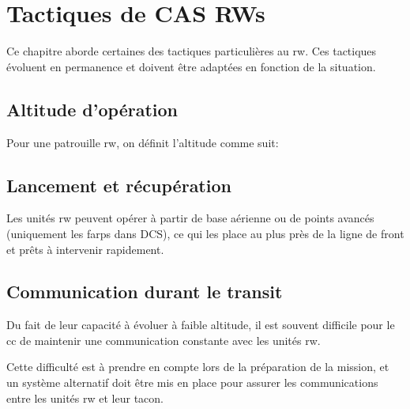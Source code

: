 \newpage

\chapter{Tactiques de CAS RWs}

\e
    \item Ce chapitre aborde certaines des tactiques particulières au \gls{rw}. Ces tactiques évoluent en permanence et doivent être adaptées en fonction de la situation.
    \item {}
\ed

\section{Altitude d’opération}

\e
    \item Pour une patrouille \acrshort{rw}, on définit l’altitude comme suit:
\ed

\section{Lancement et récupération}

\e
    \item
    Les unités \gls{rw} peuvent opérer à partir de base aérienne ou de points avancés (uniquement les \glspl{farp} dans DCS), ce qui les place au plus près de la ligne de front et prêts à intervenir rapidement.
\ed

\section{Communication durant le transit}

\e
    \item
    Du fait de leur capacité à évoluer à faible altitude, il est souvent difficile pour le \gls{cc} de maintenir une communication constante avec les unités \gls{rw}.
    \item
    Cette difficulté est à prendre en compte lors de la préparation de la mission,  et un système alternatif doit être mis en place pour assurer les communications entre les unités \gls{rw} et leur \gls{tacon}.
\ed

